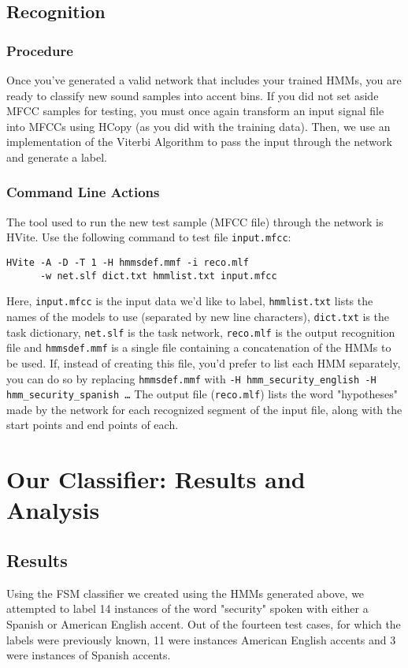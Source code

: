 \documentclass{wileySev}
\begin{document}
\chapter{Recognition}
\section{Procedure}
Once you've generated a valid network that includes your trained HMMs, you are ready to classify new sound samples into accent bins. If you did not set aside MFCC samples for testing, you must once again transform an input signal file into MFCCs using HCopy (as you did with the training data). Then, we use an implementation of the Viterbi Algorithm to pass the input through the network and generate a label.
\section{Command Line Actions}
The tool used to run the new test sample (MFCC file) through the network is HVite. Use the following command to test file \texttt{input.mfcc}:
\begin{verbatim}
HVite -A -D -T 1 -H hmmsdef.mmf -i reco.mlf 
      -w net.slf dict.txt hmmlist.txt input.mfcc
\end{verbatim}
Here, \texttt{input.mfcc} is the input data we'd like to label, \texttt{hmmlist.txt} lists the names of the models to use (separated by new line characters), \texttt{dict.txt} is the task dictionary, \texttt{net.slf} is the task network, \texttt{reco.mlf} is the output recognition file and \texttt{hmmsdef.mmf} is a single file containing a concatenation of the HMMs to be used. If, instead of creating this file, you'd prefer to list each HMM separately, you can do so by replacing \texttt{hmmsdef.mmf} with \texttt{-H hmm\_security\_english -H hmm\_security\_spanish \ldots}
The output file (\texttt{reco.mlf}) lists the word "hypotheses" made by the network for each recognized segment of the input file, along with the start points and end points of each.

\part{Our Classifier: Results and Analysis}
\chapter{Results}
Using the FSM classifier we created using the HMMs generated above, we attempted to label 14 instances of the word "security" spoken with either a Spanish or American English accent. Out of the fourteen test cases, for which the labels were previously known, 11 were instances American English accents and 3 were instances of Spanish accents.
\end{document}
